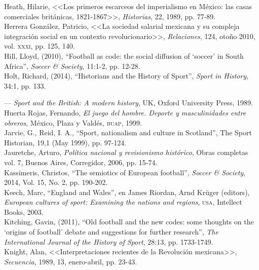 \documentclass[11pt,a5paper,twoside]{book} %
\begin{document}
\begin{hangparas}{1cm}{1}
\noindent Heath, Hilarie, <<Los primeros escarceos del imperialismo en México: las casas comerciales
británicas, 1821-1867>>, \emph{Historias}, 22, 1989, pp. 77-89. \\

\noindent Herrera González, Patricio, <<La sociedad salarial mexicana y su compleja integración social
en un contexto revolucionario>>, \emph{Relaciones}, 124, otoño 2010, vol. \textsc{xxxi}, pp. 125, 140. \\

\noindent Hill, Lloyd, (2010), “Football as code: the social diffusion of ‘soccer’ in South Africa”,
\emph{Soccer \& Society}, 11:1-2, pp. 12-28. \\

\noindent Holt, Richard, (2014), “Historians and the History of Sport”, \emph{Sport in History}, 34:1, pp. 133. \

\noindent --- \emph{Sport and the British: A modern history}, UK, Oxford University Press, 1989. \\

\noindent Huerta Rojas, Fernando, \emph{El juego del hombre. Deporte y masculinidades entre obreros}, México, Plaza y Valdés, \textsc{buap}, 1999. \\

\noindent Jarvie, G., Reid, I. A., “Sport, nationalism and culture in Scotland”, The Sport Historian, 19,1 (May 1999), pp. 97-124. \\

\noindent Jauretche, Arturo, \emph{Política nacional y revisionismo histórico}, Obras completas vol. 7, Buenos Aires, Corregidor, 2006, pp. 15-74. \\

\noindent Kassimeris, Christos, “The semiotics of European football”, \emph{Soccer \& Society}, 2014, Vol. 15, No. 2, pp. 190-202. \\

\noindent Keech, Marc, “England and Wales”, en James Riordan, Arnd Krüger (editors), \emph{European cultures of sport: Examining the nations and regions}, \textsc{usa}, Intellect Books, 2003. \\

\noindent Kitching, Gavin, (2011), “Old football and the new codes: some thoughts on the ‘origins of football’ debate and suggestions for further research”, \emph{The International Journal of the History of Sport}, 28:13, pp. 1733-1749. \\

\noindent Knight, Alan, <<Interpretaciones recientes de la Revolución mexicana>>, \emph{Secuencia}, 1989, 13, enero-abril, pp. 23-43. \\


\end{hangparas}
\end{document}
